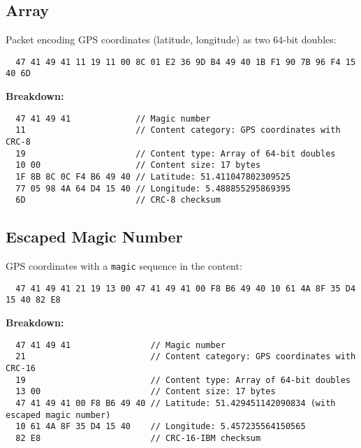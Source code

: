\documentclass[a4paper]{article}
\begin{document}
\subsection*{Array}
Packet encoding GPS coordinates (latitude, longitude) as two 64-bit doubles:
\begin{verbatim}
  47 41 49 41 11 19 11 00 8C 01 E2 36 9D B4 49 40 1B F1 90 7B 96 F4 15 40 6D
\end{verbatim}
\textbf{Breakdown:}
\begin{verbatim}
  47 41 49 41             // Magic number
  11                      // Content category: GPS coordinates with CRC-8
  19                      // Content type: Array of 64-bit doubles
  10 00                   // Content size: 17 bytes
  1F 8B 8C 0C F4 B6 49 40 // Latitude: 51.411047802309525
  77 05 98 4A 64 D4 15 40 // Longitude: 5.488855295869395
  6D                      // CRC-8 checksum
\end{verbatim}

\subsection*{Escaped Magic Number}
GPS coordinates with a \texttt{magic} sequence in the content:
\begin{verbatim}
  47 41 49 41 21 19 13 00 47 41 49 41 00 F8 B6 49 40 10 61 4A 8F 35 D4 15 40 82 E8
\end{verbatim}
\textbf{Breakdown:}
\begin{verbatim}
  47 41 49 41                // Magic number
  21                         // Content category: GPS coordinates with CRC-16
  19                         // Content type: Array of 64-bit doubles
  13 00                      // Content size: 17 bytes
  47 41 49 41 00 F8 B6 49 40 // Latitude: 51.429451142090834 (with escaped magic number)
  10 61 4A 8F 35 D4 15 40    // Longitude: 5.457235564150565
  82 E8                      // CRC-16-IBM checksum
\end{verbatim}
\end{document}
